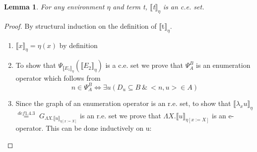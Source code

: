 \documentclass{article}
\newtheorem{lemma}[theorem]{Lemma} %
\begin{document}
	\begin{lemma}
		For any environment $\eta$ and term t, 
			$\llbracket$t$\rrbracket_\eta$ is an c.e. set.
	\end{lemma}
	\begin{proof}
		By structural induction on the definition of 
			$\llbracket$t$\rrbracket_\eta$.
		\begin{enumerate}
			\item 
				$\llbracket x \rrbracket_\eta = \eta (x)$ by definition
			\item
				To show that $\Psi_{\llbracket E_1 \rrbracket_\eta} 
				(\llbracket E_2 \rrbracket_\eta)$ is a c.e. set we
				prove that $\Psi^B_A$ is an enumeration operator which 
				follows from 
				\begin{equation} 
					n \in \Psi^B_A \iff \exists u (D_u \subseteq B 
					\:\&\: <n, u> \in A)
				\end{equation}
			\item
				Since the graph of an enumeration operator is an r.e.
				set, to show that 
				$\llbracket \lambda_x u \rrbracket_\eta$ 
				$\stackrel{def 1.4.3}{=}$ 
				$G_{\Lambda X. \llbracket u \rrbracket_{\eta [x := X]}}$
				is an r.e. set we prove that
				$\Lambda X. \llbracket u \rrbracket_{\eta [x := X]}$
				is an e-operator. This can be done inductively on u:


\end{enumerate}
\end{proof}
\end{document}
